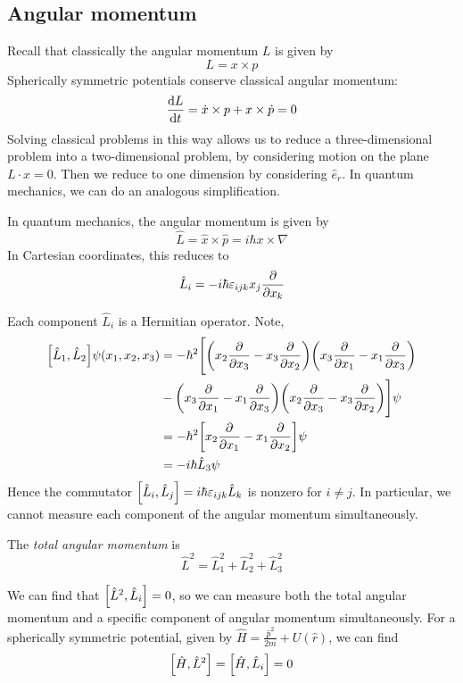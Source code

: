 \subsection{Angular momentum}
Recall that classically the angular momentum \( L \) is given by
\[
	L = x \times p
\]
Spherically symmetric potentials conserve classical angular momentum:
\[
	\dv{L}{t} = \dot x \times p + x \times \dot p = 0
\]
Solving classical problems in this way allows us to reduce a three-dimensional problem into a two-dimensional problem, by considering motion on the plane \( L \cdot x = 0 \).
Then we reduce to one dimension by considering \( \hat e_r \).
In quantum mechanics, we can do an analogous simplification.
\begin{definition}
	In quantum mechanics, the angular momentum is given by
	\[
		\hat L = \hat x \times \hat p = i \hbar x \times \nabla
	\]
	In Cartesian coordinates, this reduces to
	\[
		\hat L_i = -i \hbar \varepsilon_{ijk} x_j \pdv{x_k}
	\]
\end{definition}
Each component \( \hat L_i \) is a Hermitian operator.
Note,
\begin{align*}
	\qty[\hat L_1, \hat L_2] \psi(x_1, x_2, x_3) & = -\hbar^2\Bigg[\qty(x_2 \pdv{x_3} - x_3 \pdv{x_2})\qty(x_3 \pdv{x_1} - x_1 \pdv{x_3}) \\
												 & - \qty(x_3 \pdv{x_1} - x_1 \pdv{x_3})\qty(x_2 \pdv{x_3} - x_3 \pdv{x_2})\Bigg] \psi \\
	                                             & = -\hbar^2 \qty[ x_2 \pdv{x_1} - x_1 \pdv{x_2} ] \psi                                                                                                                \\
	                                             & = -i \hbar \hat L_3 \psi
\end{align*}
Hence the commutator \( \qty[\hat L_i, \hat L_j] = i \hbar \varepsilon_{ijk} \hat L_k \) is nonzero for \( i \neq j \).
In particular, we cannot measure each component of the angular momentum simultaneously.
\begin{definition}
	The \textit{total angular momentum} is
	\[
		\hat L^2 = \hat L_1^2 + \hat L_2^2 + \hat L_3^2
	\]
\end{definition}
We can find that \( \qty[\hat L^2, \hat L_i] = 0 \), so we can measure both the total angular momentum and a specific component of angular momentum simultaneously.
For a spherically symmetric potential, given by \( \hat H = \frac{\hat p^2}{2m} + U(\hat r) \), we can find
\[
	\qty[\hat H, \hat L^2] = \qty[\hat H, \hat L_i] = 0
\]

